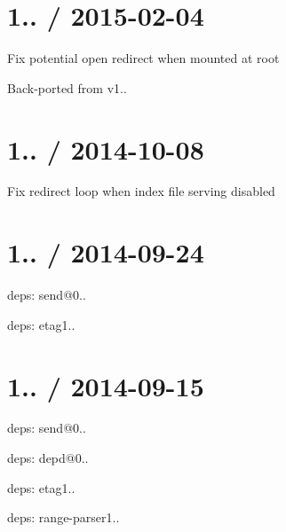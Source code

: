 \section*{1.. / 2015-\/02-\/04 }


\begin{DoxyItemize}
\item Fix potential open redirect when mounted at root
\begin{DoxyItemize}
\item Back-\/ported from v1..
\end{DoxyItemize}
\end{DoxyItemize}

\section*{1.. / 2014-\/10-\/08 }


\begin{DoxyItemize}
\item Fix redirect loop when index file serving disabled
\end{DoxyItemize}

\section*{1.. / 2014-\/09-\/24 }


\begin{DoxyItemize}
\item deps\+: send@0..
\begin{DoxyItemize}
\item deps\+: etag1..
\end{DoxyItemize}
\end{DoxyItemize}

\section*{1.. / 2014-\/09-\/15 }


\begin{DoxyItemize}
\item deps\+: send@0..
\begin{DoxyItemize}
\item deps\+: depd@0..
\item deps\+: etag1..
\item deps\+: range-\/parser1..
\end{DoxyItemize}
\end{DoxyItemize}

